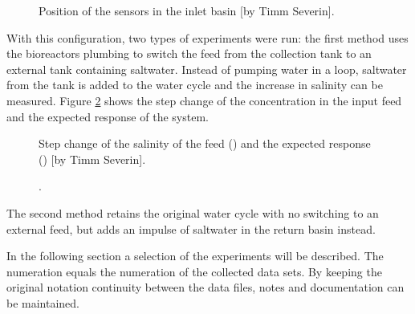 \begin{figure}
\begin{center}
		\caption{Position of the sensors in the inlet basin [by Timm Severin].}
		\label{fig:senspos}
	\end{center}
\end{figure}

With this configuration, two types of experiments were run: the first method uses the bioreactors plumbing to switch the feed from the collection tank to an external tank containing saltwater. Instead of pumping water in a loop, saltwater from the tank is added to the water cycle and the increase in salinity can be measured. Figure \ref{fig:rest} shows the step change of the concentration in the input feed and the expected response of the system.

\begin{figure}
	\begin{center}
		
		\caption[Step change of the salinity of the feed and the expected response [by Timm Severin].{Step change of the salinity of the feed () and the expected response () [by Timm Severin].}
		\label{fig:rest}
	\end{center}
\end{figure}

The second method retains the original water cycle with no switching to an external feed, but adds an impulse of saltwater in the return basin instead.

In the following section a selection of the experiments will be described. The numeration equals the numeration of the collected data sets. By keeping the original notation continuity between the data files, notes and documentation can be maintained.\\

